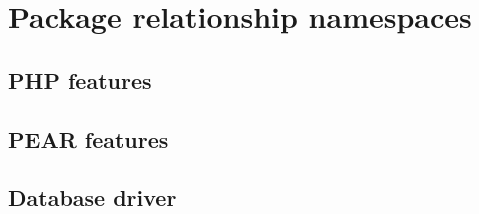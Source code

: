 \section[sec:package relationship namespaces]{Package relationship namespaces}

\subsection[sec:package relationship namespaces php features]{PHP features}


\subsection[sec:package relationship namespaces pear packages]{PEAR features}


\subsection[sec:package relationship namespaces database drivers]{Database driver}

